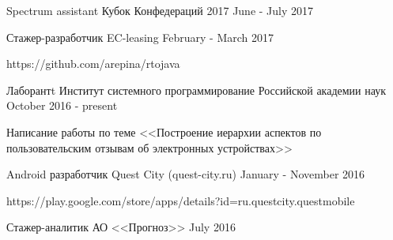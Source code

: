 



\begin{cventries}
	
	\cventrynodescription
	{Spectrum assistant} %
	{Кубок Конфедераций 2017} %
	{} %
	{June - July 2017} %


\cventry
{Стажер-разработчик} %
{EC-leasing} %
{} %
{February - March 2017} %
{ 
	\begin{cvitems}
		\item {https://github.com/arepina/rtojava}
	\end{cvitems}
}



\cventry
{Лаборантt} %
{Институт системного программирование Российской академии наук} %
{} %
{October 2016 - present} %
{ 
	\begin{cvitems}
		\item {Написание работы по теме <<Построение иерархии аспектов по пользовательским отзывам об электронных устройствах>>}
	\end{cvitems}
}


\cventry
{Android разработчик} %
{Quest City (quest-city.ru)} %
{} %
{January - November 2016} %
{ %
  \begin{cvitems}
\item {https://play.google.com/store/apps/details?id=ru.questcity.questmobile}
 \end{cvitems}
}


\cventrynodescription
{Стажер-аналитик} %
{АО <<Прогноз>>} %
{} %
{July 2016} %



\end{cventries}

